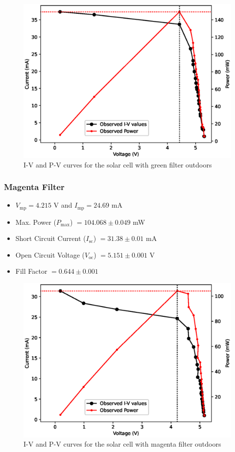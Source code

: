 \begin{figure}[H]
    \centering
    \includegraphics[width=1\columnwidth]{images/out/green.eps}
    \caption{I-V and P-V curves for the solar cell with green filter outdoors}
\end{figure}


\subsubsection{Magenta Filter}
\begin{itemize}
    \item $V_\text{mp} = 4.215$ V and $I_\text{mp} = 24.69$ mA
    \item Max. Power ($P_\text{max}$) $= 104.068 \pm 0.049 $ mW
    \item Short Circuit Current ($I_\text{sc}$) $= 31.38 \pm 0.01$ mA
    \item Open Circuit Voltage ($V_\text{oc}$) $= 5.151 \pm 0.001$ V
    \item Fill Factor $= 0.644 \pm 0.001$
\end{itemize}

\begin{figure}[H]
    \centering
    \includegraphics[width=1\columnwidth]{images/out/pink.eps}
    \caption{I-V and P-V curves for the solar cell with magenta filter outdoors}
\end{figure}


